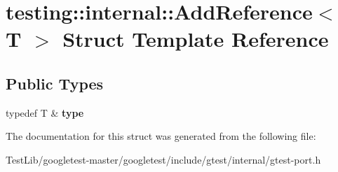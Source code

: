 \hypertarget{structtesting_1_1internal_1_1AddReference}{}\section{testing\+:\+:internal\+:\+:Add\+Reference$<$ T $>$ Struct Template Reference}
\label{structtesting_1_1internal_1_1AddReference}
\subsection*{Public Types}
\begin{DoxyCompactItemize}
\item 
\mbox{\label{structtesting_1_1internal_1_1AddReference_a2df8dd7c4e41f6390e6e66b1a9a67bb4}} 
typedef T \& {\bfseries type}
\end{DoxyCompactItemize}


The documentation for this struct was generated from the following file\+:\begin{DoxyCompactItemize}
\item 
Test\+Lib/googletest-\/master/googletest/include/gtest/internal/gtest-\/port.\+h\end{DoxyCompactItemize}
